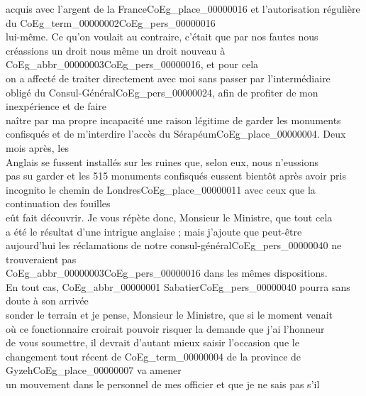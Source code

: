 \documentclass{book}
\begin{document}
acquis avec l’argent de la France\gls{CoEg_place_00000016} et l’autorisation régulière du \gls{CoEg_term_00000002}\gls{CoEg_pers_00000016}\\
lui-même. Ce qu’on voulait au contraire, c’était que par nos fautes nous\\
créassions un droit nous même un droit nouveau à \gls{CoEg_abbr_00000003}\gls{CoEg_pers_00000016}, et pour cela\\
on a affecté de traiter directement avec moi sans passer par l’intermédiaire\\
obligé du Consul-Général\gls{CoEg_pers_00000024}, afin de profiter de mon inexpérience et de faire\\
naître par ma propre incapacité une raison légitime de garder les monuments\\
confisqués et de m’interdire l’accès du Sérapéum\gls{CoEg_place_00000004}. Deux mois après, les\\
Anglais se fussent installés sur les ruines que, selon eux, nous n’eussions\\
pas su garder et les 515 monuments confisqués eussent bientôt après avoir pris\\
incognito le chemin de Londres\gls{CoEg_place_00000011} avec ceux que la continuation des fouilles\\
eût fait découvrir. Je vous répète donc, Monsieur le Ministre, que tout cela\\
a été le résultat d’une intrigue anglaise ; mais j’ajoute que peut-être\\
aujourd’hui les réclamations de notre consul-général\gls{CoEg_pers_00000040} ne trouveraient pas\\
\gls{CoEg_abbr_00000003}\gls{CoEg_pers_00000016} dans les mêmes dispositions.\\
\indent En tout cas, \gls{CoEg_abbr_00000001} Sabatier\gls{CoEg_pers_00000040} pourra sans doute à son arrivée\\
sonder le terrain et je pense, Monsieur le Ministre, que si le moment venait\\
où ce fonctionnaire croirait pouvoir risquer la demande que j’ai l’honneur\\
de vous soumettre, il devrait d’autant mieux saisir l’occasion que le\\
changement tout récent de \Gls{CoEg_term_00000004} de la province de Gyzeh\gls{CoEg_place_00000007} va amener\\
un mouvement dans le personnel de mes officier et que je ne sais pas s’il\\
\end{document}
